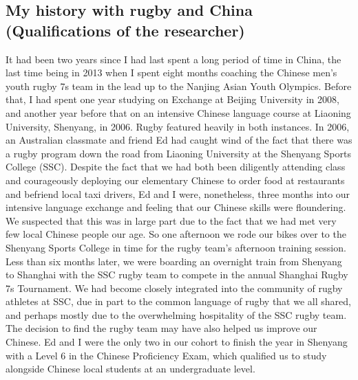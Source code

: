   \subsection{My history with rugby and China (Qualifications of the researcher)}
  It had been two years since I had last spent a long period of time in China, the last time being in 2013 when I spent eight months coaching the Chinese men's youth rugby 7s team in the lead up to the Nanjing Asian Youth Olympics.  Before that, I had spent one year studying on Exchange at Beijing University in 2008, and another year before that on an intensive Chinese language course at Liaoning University, Shenyang, in 2006.  Rugby featured heavily in both instances.  In 2006, an Australian classmate and friend Ed had caught wind of the fact that there was a rugby program down the road from Liaoning University at the Shenyang Sports College (SSC).  Despite the fact that we had both been diligently attending class and courageously deploying our elementary Chinese to order food at restaurants and befriend local taxi drivers, Ed and I were, nonetheless, three months into our intensive language exchange and feeling that our Chinese skills were floundering.  We suspected that this was in large part due to the fact that we had met very few local Chinese people our age.  So one afternoon we rode our bikes over to the Shenyang Sports College in time for the rugby team's afternoon training session.  Less than six months later, we were boarding an overnight train from Shenyang to Shanghai with the SSC rugby team to compete in the annual Shanghai Rugby 7s Tournament.  We had become closely integrated into the community of rugby athletes at SSC, due in part to the common language of rugby that we all shared, and perhaps mostly due to the overwhelming hospitality of the SSC rugby team.  The decision to find the rugby team may have also helped us improve our Chinese. Ed and I were the only two in our cohort to finish the year in Shenyang with a Level 6 in the Chinese Proficiency Exam, which qualified us to study alongside Chinese local students at an undergraduate level.

